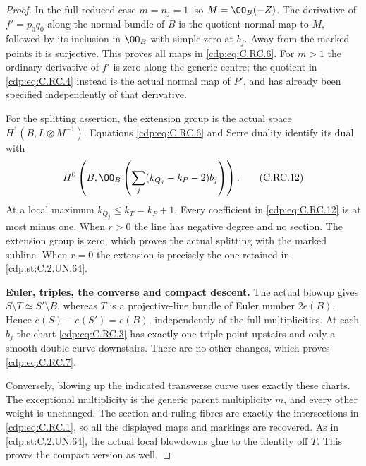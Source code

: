 \begin{proof}
In the full reduced case
$m=n_j=1$, so $M=\OO_B(-Z)$.
The derivative of
$f'=p_0q_0$ along the
normal bundle of $B$
is the quotient normal
map to $M$, followed by
its inclusion in $\OO_B$
with simple zero at $b_j$.
Away from the marked
points it is surjective.
This proves all maps in
\eqref{cdp:eq:C.RC.6}. For $m>1$ the
ordinary derivative of
$f'$ is zero along the
generic centre; the
quotient in \eqref{cdp:eq:C.RC.4}
instead is the actual
normal map of $P'$,
and has already been
specified independently
of that derivative.

For the splitting assertion,
the extension group is the
actual space $H^1(B,L\otimes
M^{-1})$. Equations \eqref{cdp:eq:C.RC.6}
and Serre duality identify
its dual with
\[
 H^0\left(B,\OO_B\left(
                   \sum_j(k_{Q_j}-k_P-2)b_j\right)\right).
\tag{C.RC.12}\label{cdp:eq:C.RC.12}
\]
At a local maximum
$k_{Q_j}\le k_T=k_P+1$.
Every coefficient in
\eqref{cdp:eq:C.RC.12} is at most
minus one. When $r>0$
the line has negative
degree and no section.
The extension group is
zero, which proves the
actual splitting with
the marked subline.
When $r=0$ the extension
is precisely the one
retained in \ref{cdp:st:C.2.UN.64}.

\par\medskip\noindent\textbf{Euler, triples, the converse and compact descent.}
The actual blowup gives
$S\setminus T\simeq S'\setminus B$,
whereas $T$ is a
projective-line bundle
of Euler number $2e(B)$.
Hence $e(S)-e(S')=e(B)$,
independently of the
full multiplicities.
At each $b_j$ the chart
\eqref{cdp:eq:C.RC.3} has exactly one
triple point upstairs
and only a smooth double
curve downstairs. There
are no other changes,
which proves \eqref{cdp:eq:C.RC.7}.

Conversely, blowing up the
indicated transverse curve
uses exactly these charts.
The exceptional multiplicity
is the generic parent
multiplicity $m$, and
every other weight is
unchanged. The section
and ruling fibres are
exactly the intersections
in \eqref{cdp:eq:C.RC.1}, so all
the displayed maps and
markings are recovered.
As in \ref{cdp:st:C.2.UN.64}, the actual
local blowdowns glue to
the identity off $T$.
This proves the compact
version as well.
\end{proof}


